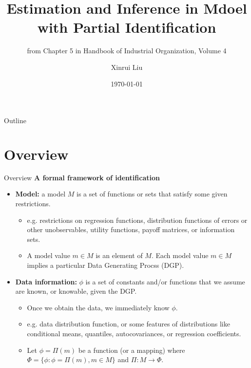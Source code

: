 \documentclass[aspectratio=169]{beamer}  %
\title{Estimation and Inference in Mdoel with Partial Identification}
\subtitle{from Chapter 5 in Handbook of Industrial Organization, Volume 4}
\author{Xinrui Liu}
\institute{Hong Kong University of Science and Technology}
\date{\today}
\begin{document}
\begin{frame}
    \titlepage
\end{frame}

\begin{frame}{Outline}
    \tableofcontents
\end{frame}

\section{Overview}

\begin{frame}{Overview}
\textbf{A formal framework of identification}
\begin{itemize}
    \item \textbf{Model:} a model $M$ is a set of functions or sets that satisfy some given restrictions.
    \begin{itemize}
        \item e.g. restrictions on regression functions, distribution functions of errors or other unobservables, utility functions, payoff matrices, or information sets.
        \item A model value $m \in M$ is an element of $M$. Each model value $m \in M$ implies a particular Data Generating Procss (DGP).
    \end{itemize}
    \item \textbf{Data information:} $\phi$ is a set of constants and/or functions that we assume are known, or knowable, given the DGP.
    \begin{itemize}
        \item Once we obtain the data, we immediately know $\phi$. 
        \item e.g. data distribution function, or some features of distributions like conditional means, quantiles, autocovariances, or regression coefficients.
        \item Let $\phi =\Pi(m)$ be a function (or  a mapping) where $\Phi=\{\phi: \phi=\Pi(m), m \in M\}$ and $\Pi{:}M\to\Phi$.
    \end{itemize}
    
\end{itemize}
\end{frame}
\end{document}
